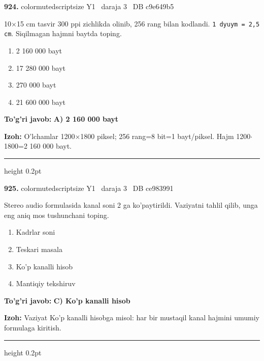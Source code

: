 \documentclass[10pt,a4paper,oneside]{article}
\begin{document}
\noindent\textbf{\color{ink}924.}  {color{muted}scriptsize Y1 \textbullet\ daraja 3 \textbullet\ DB c9e649b5}
\par
10\ensuremath{\times}15 cm tasvir 300 ppi zichlikda olinib, 256 rang bilan kodlandi. \texttt{1 dyuym = 2,5 cm}. Siqilmagan hajmni baytda toping.
\begin{enumerate}[label=\Alph*),leftmargin=9mm]
\item 2 160 000 bayt
\item 17 280 000 bayt
\item 270 000 bayt
\item 21 600 000 bayt
\end{enumerate}
\begin{tcolorbox}[enhanced,breakable,colback=teal!4,colframe=teal!50!black,boxrule=0.5pt,arc=1.1mm,left=3mm,right=3mm,top=1.7mm,bottom=1.7mm,before skip=2mm,after skip=2mm]
\textbf{\color{teal}To'g'ri javob:} \textbf{A) 2 160 000 bayt}
\par\smallskip
\textbf{Izoh:} O'lchamlar 1200\ensuremath{\times}1800 piksel; 256 rang=8 bit=1 bayt/piksel. Hajm 1200\ensuremath{\cdot}1800=2 160 000 bayt.
\end{tcolorbox}
\vspace{2mm}\hrule height 0.2pt \vspace{3mm}

\noindent\textbf{\color{ink}925.}  {color{muted}scriptsize Y1 \textbullet\ daraja 3 \textbullet\ DB ce983991}
\par
Stereo audio formulasida kanal soni 2 ga ko'paytirildi. Vaziyatni tahlil qilib, unga eng aniq mos tushunchani toping.
\begin{enumerate}[label=\Alph*),leftmargin=9mm]
\item Kadrlar soni
\item Teskari masala
\item Ko'p kanalli hisob
\item Mantiqiy tekshiruv
\end{enumerate}
\begin{tcolorbox}[enhanced,breakable,colback=teal!4,colframe=teal!50!black,boxrule=0.5pt,arc=1.1mm,left=3mm,right=3mm,top=1.7mm,bottom=1.7mm,before skip=2mm,after skip=2mm]
\textbf{\color{teal}To'g'ri javob:} \textbf{C) Ko'p kanalli hisob}
\par\smallskip
\textbf{Izoh:} Vaziyat Ko'p kanalli hisobga misol: har bir mustaqil kanal hajmini umumiy formulaga kiritish.
\end{tcolorbox}
\vspace{2mm}\hrule height 0.2pt \vspace{3mm}
\end{document}
